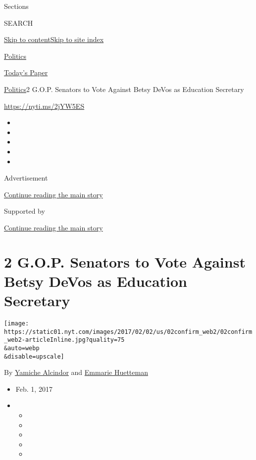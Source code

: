 Sections

SEARCH

\protect\hyperlink{site-content}{Skip to
content}\protect\hyperlink{site-index}{Skip to site index}

\href{https://www.nytimes.com/section/politics}{Politics}

\href{https://myaccount.nytimes.com/auth/login?response_type=cookie\&client_id=vi}{}

\href{https://www.nytimes.com/section/todayspaper}{Today's Paper}

\href{/section/politics}{Politics}\textbar{}2 G.O.P. Senators to Vote
Against Betsy DeVos as Education Secretary

\url{https://nyti.ms/2jYW5ES}

\begin{itemize}
\item
\item
\item
\item
\item
\end{itemize}

Advertisement

\protect\hyperlink{after-top}{Continue reading the main story}

Supported by

\protect\hyperlink{after-sponsor}{Continue reading the main story}

\hypertarget{2-gop-senators-to-vote-against-betsy-devos-as-education-secretary}{%
\section{2 G.O.P. Senators to Vote Against Betsy DeVos as Education
Secretary}\label{2-gop-senators-to-vote-against-betsy-devos-as-education-secretary}}

\texttt{[image: https://static01.nyt.com/images/2017/02/02/us/02confirm\_web2/02confirm\_web2-articleInline.jpg?quality=75\\\&auto=webp\\\&disable=upscale]}

By \href{http://www.nytimes.com/by/yamiche-alcindor}{Yamiche Alcindor}
and \href{https://www.nytimes.com/by/emmarie-huetteman}{Emmarie
Huetteman}

\begin{itemize}
\item
  Feb. 1, 2017
\item
  \begin{itemize}
  \item
  \item
  \item
  \item
  \item
  \end{itemize}
\end{itemize}

